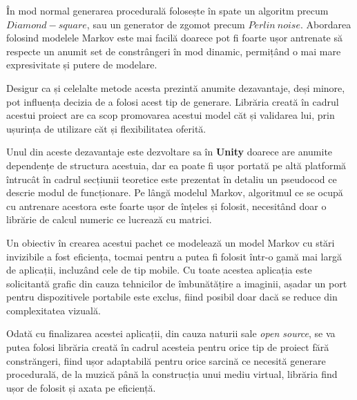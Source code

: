 În mod normal generarea procedurală folosește în spate un algoritm precum $Diamond-square$, sau un generator de zgomot precum $Perlin \ noise$. Abordarea folosind modelele Markov este mai facilă doarece pot fi foarte ușor antrenate să respecte un anumit set de constrângeri în mod dinamic, permițând o mai mare expresivitate și putere de modelare. \par

Desigur ca și celelalte metode acesta prezintă anumite dezavantaje, deși minore, pot influența decizia de a folosi acest tip de generare. Librăria creată în cadrul acestui proiect are ca scop promovarea acestui model căt și validarea lui, prin ușurința de utilizare căt și flexibilitatea oferită.\par

Unul din aceste dezavantaje este dezvoltare sa în \textbf{Unity} doarece are anumite dependențe de structura acestuia, dar ea poate fi ușor portată pe altă platformă întrucât în cadrul secțiunii teoretice este prezentat în detaliu un pseudocod ce descrie modul de funcționare. Pe lângă modelul Markov, algoritmul ce se ocupă cu antrenare acestora este foarte ușor de înțeles și folosit, necesitând doar o librărie de calcul numeric ce lucrează cu matrici.\par  

Un obiectiv în crearea acestui pachet ce modelează un model Markov cu stări invizibile a fost eficiența, tocmai pentru a putea fi folosit într-o gamă mai largă de aplicații, incluzând cele de tip mobile. Cu toate acestea aplicația este solicitantă grafic din cauza tehnicilor de îmbunătățire a imaginii, așadar un port pentru dispozitivele portabile este exclus, fiind posibil doar dacă se reduce din complexitatea vizuală.\par

Odată cu finalizarea acestei aplicații, din cauza naturii sale \textit{open source}, se va putea folosi librăria creată în cadrul acesteia pentru orice tip de proiect fără constrăngeri, fiind ușor adaptabilă pentru orice sarcină ce necesită generare procedurală, de la muzică până la construcția unui mediu virtual, librăria find ușor de folosit și axata pe eficiență.\par

